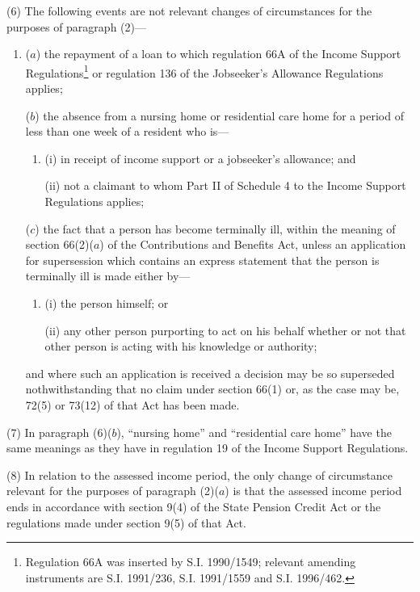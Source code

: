 \documentclass[12pt,a4paper]{article}
\begin{document}
(6) The following events are not relevant changes of circumstances for the purposes of paragraph (2)—
\begin{enumerate}\item[]
($a$) the repayment of a loan to which regulation 66A of the Income Support Regulations\footnote{\frenchspacing Regulation 66A was inserted by S.I. 1990/1549; relevant amending instruments are S.I. 1991/236, S.I. 1991/1559 and S.I. 1996/462.} or regulation 136 of the Jobseeker’s Allowance Regulations applies;

($b$) the absence from a nursing home or residential care home for a period of less than one week of a resident who is—
\begin{enumerate}\item[]
(i) in receipt of income support or a jobseeker’s allowance; and

(ii) not a claimant to whom Part II of Schedule 4 to the Income Support Regulations applies;
\end{enumerate}

($c$) the fact that a person has become terminally ill, within the meaning of section 66(2)($a$) of the Contributions and Benefits Act, unless an application for supersession which contains an express statement that the person is terminally ill is made either by—
\begin{enumerate}\item[]
(i) the person himself; or

(ii) any other person purporting to act on his behalf whether or not that other person is acting with his knowledge or authority;
\end{enumerate}
and where such an application is received a decision may be so superseded nothwithstanding that no claim under section 66(1) or, as the case may be, 72(5) or 73(12) of that Act has been made.
\end{enumerate}

(7) In paragraph (6)($b$), “nursing home” and “residential care home” have the same meanings as they have in regulation 19 of the Income Support Regulations.

(8) In relation to the assessed income period, the only change of circumstance relevant for the purposes of paragraph (2)($a$)  is that the assessed income period ends in accordance with section 9(4) of the State Pension Credit Act or the regulations made under section 9(5) of that Act.
\end{document}
